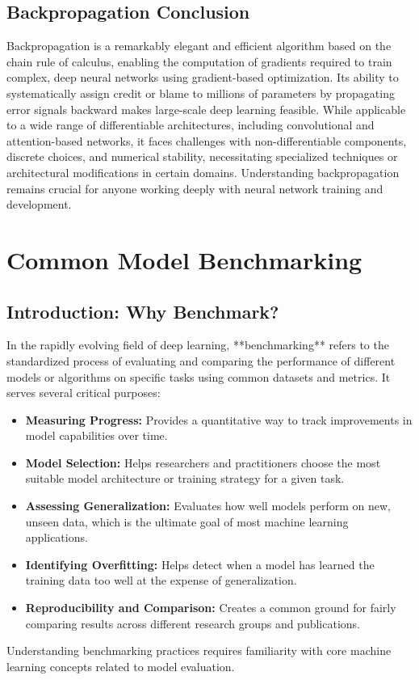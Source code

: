 \documentclass{article}
\begin{document}
\subsection{Backpropagation Conclusion}
Backpropagation is a remarkably elegant and efficient algorithm based on the chain rule of calculus, enabling the computation of gradients required to train complex, deep neural networks using gradient-based optimization. Its ability to systematically assign credit or blame to millions of parameters by propagating error signals backward makes large-scale deep learning feasible. While applicable to a wide range of differentiable architectures, including convolutional and attention-based networks, it faces challenges with non-differentiable components, discrete choices, and numerical stability, necessitating specialized techniques or architectural modifications in certain domains. Understanding backpropagation remains crucial for anyone working deeply with neural network training and development.
















\section{Common Model Benchmarking}

\subsection{Introduction: Why Benchmark?}

In the rapidly evolving field of deep learning, **benchmarking** refers to the standardized process of evaluating and comparing the performance of different models or algorithms on specific tasks using common datasets and metrics. It serves several critical purposes:
\begin{itemize}
    \item \textbf{Measuring Progress:} Provides a quantitative way to track improvements in model capabilities over time.
    \item \textbf{Model Selection:} Helps researchers and practitioners choose the most suitable model architecture or training strategy for a given task.
    \item \textbf{Assessing Generalization:} Evaluates how well models perform on new, unseen data, which is the ultimate goal of most machine learning applications.
    \item \textbf{Identifying Overfitting:} Helps detect when a model has learned the training data too well at the expense of generalization.
    \item \textbf{Reproducibility and Comparison:} Creates a common ground for fairly comparing results across different research groups and publications.
\end{itemize}
Understanding benchmarking practices requires familiarity with core machine learning concepts related to model evaluation.
\end{document}
